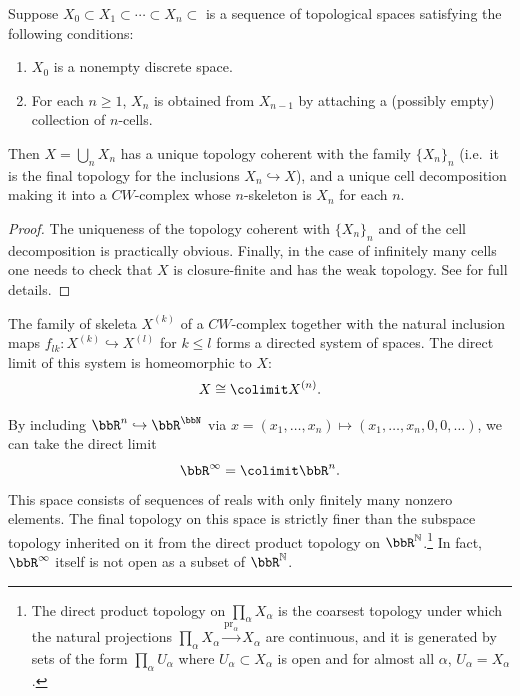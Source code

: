 \begin{thm}
    Suppose $X_0\subset X_1\subset\cdots \subset X_{n}\subset $ is a sequence of topological spaces satisfying the following conditions:
    \begin{enumerate}[label=(\roman*)]
        \item $X_0$ is a nonempty discrete space.
        \item For each $n\geq 1$, $X_n$ is obtained from $X_{n-1}$ by attaching a (possibly empty) collection of $n$-cells.
    \end{enumerate}
    Then $X=\bigcup_n X_n$ has a unique topology coherent with the family $\{X_n\}_n$ (i.e.\ it is the final topology for the inclusions $X_n\hookrightarrow X$), and a unique cell decomposition making it into a $CW$-complex whose $n$-skeleton is $X_n$ for each $n$.
\end{thm}
\begin{proof}
    The uniqueness of the topology coherent with $\{X_n\}_n$ and of the cell decomposition is practically obvious. Finally, in the case of infinitely many cells one needs to check that $X$ is closure-finite and has the weak topology. See {{\cite[Thm.~5.20]{LeeTop}}} for full details.
\end{proof}

\begin{cor}
    The family of skeleta $X^{(k)}$ of a $CW$-complex together with the natural inclusion maps $f_{lk}:X^{(k)}\hookrightarrow X^{(l)}$ for $k\leq l$ forms a directed system of spaces. The direct limit of this system is homeomorphic to $X$: 
    \[X\cong \colimit X^{(n)}.\]
\end{cor}


\begin{example}[$\bbR^\infty$]\index{$\bbR^\infty$}\label{R-infty}
    By including $\bbR^n\hookrightarrow \bbR^{\bbN }$ via $x=(x_1,\ldots,x_n)\mapsto (x_1,\ldots,x_n,0,0,\ldots)$, we can take the direct limit
    \[\bbR^\infty=\colimit \bbR^n.\]
    This space consists of sequences of reals with only finitely many nonzero elements. The final topology on this space is strictly finer than the subspace topology inherited on it from the direct product topology on $\bbR^{\mathbb{N}}$.\footnote{The direct product topology on $\prod_\alpha X_\alpha$ is the coarsest topology under which the natural projections $\prod_\alpha X_\alpha\overset{\mathrm{pr}_\alpha}{\to} X_\alpha$ are continuous, and it is generated by sets of the form $\prod_\alpha U_\alpha$ where $U_\alpha\subset X_\alpha$ is open and for almost all $\alpha$, $U_\alpha=X_\alpha$.} In fact, $\bbR^\infty$ itself is not open as a subset of $\bbR^{\mathbb{N}}$.
\end{example}

